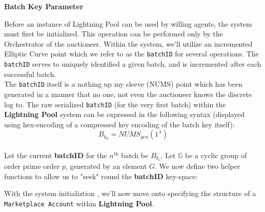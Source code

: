 \documentclass[10pt,a4paper]{article}
\theoremstyle{definition}
\begin{document}
\begin{center}
    \textbf{Batch Key Parameter}
\end{center}

Before an instance of Lightning Pool can be used by willing agents, the system
must first be initialized. This operation can be performed only by the
Orchestrator of the auctioneer. Within the system, we'll utilize an incremented
Elliptic Curve point which we refer to as the \texttt{batchID} for several
operations. The \texttt{batchID} serves to uniquely identified a given batch,
and is incremented after each successful batch. \\

The \texttt{batchID} itself is a nothing up my sleeve (NUMS) point which has
been generated in a manner that no one, not even the auctioneer knows the
discrete log to. The raw serialized \texttt{batchID} (for the very first batch)
within the \textbf{Lightning Pool} system can be expressed in the following
syntax (displayed using hex-encoding of a compressed key encoding of the batch
key itself): \\
\[
    B_{k_0} = NUMS_{gen}(1^\lambda)
\] \\

Let the current \textbf{batchID} for the $n^{\text{th}}$ batch be $B_{k_i}$.
Let $\mathbb{G}$ be a cyclic group of order prime order $p$, generated by an
element $G$.  We now define two helper functions to allow us to "seek" round
the \textbf{batchID} key-space:
\begin{pcvstack}[boxed,center, space=1em]
     \begin{pchstack}

     \end{pchstack}

     \begin{center}
     \end{center}
\end{pcvstack} %

With the system initializtion , we'll now move onto specifying the structure of
a \texttt{Marketplace Account} within \textbf{Lightning Pool}.
\end{document}
